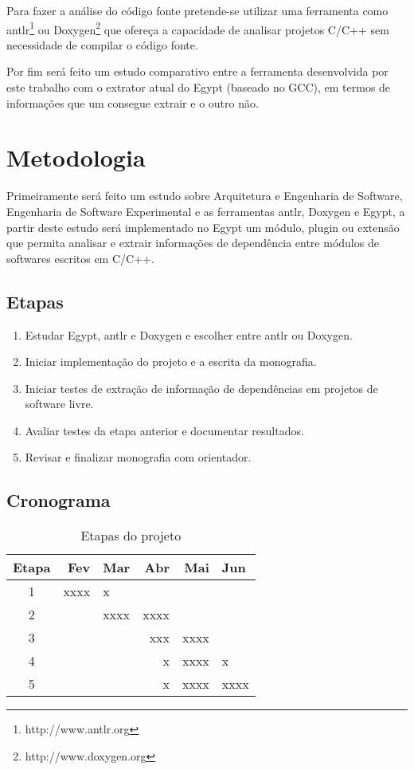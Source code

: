 Para fazer a análise do código fonte pretende-se utilizar uma ferramenta como
antlr\footnote{http://www.antlr.org} ou Doxygen\footnote{http://www.doxygen.org}
que ofereça a capacidade de analisar projetos C/C++ sem necessidade de compilar
o código fonte.

Por fim será feito um estudo comparativo entre a ferramenta desenvolvida por
este trabalho com o extrator atual do Egypt (baseado no GCC), em termos de
informações que um consegue extrair e o outro não.

\chapter{Metodologia}

Primeiramente será feito um estudo sobre Arquitetura e Engenharia de Software,
Engenharia de Software Experimental e as ferramentas antlr, Doxygen e Egypt, a
partir deste estudo será implementado no Egypt um módulo, plugin ou extensão
que permita analisar e extrair informações de dependência entre módulos de
softwares escritos em C/C++.

\section{Etapas}

\begin{enumerate}
\item Estudar Egypt, antlr e Doxygen e escolher entre antlr ou Doxygen.
\item Iniciar implementação do projeto e a escrita da monografia.
\item Iniciar testes de extração de informação de dependências em projetos de software livre.
\item Avaliar testes da etapa anterior e documentar resultados.
\item Revisar e finalizar monografia com orientador.
\end{enumerate}

\section{Cronograma}

\begin{table}
\caption{Etapas do projeto}
\centering
\begin{tabular}{c r l r r l}
Etapa  & Fev  & Mar  & Abr  & Mai  & Jun  \\
\hline
1      & xxxx & x    &      &      &      \\
2      &      & xxxx & xxxx &      &      \\
3      &      &      &  xxx & xxxx &      \\
4      &      &      &    x & xxxx & x    \\
5      &      &      &    x & xxxx & xxxx \\
\hline
\end{tabular}
\end{table}
